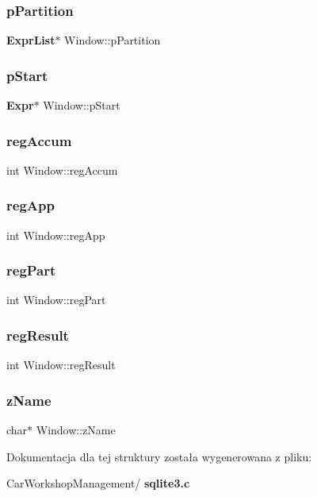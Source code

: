 \subsubsection{pPartition}
{\footnotesize\ttfamily \textbf{ Expr\+List}$\ast$ Window\+::p\+Partition}

\mbox{\label{struct_window_af181bb0792e99ca41c9c3e65b7dd5750}} 
\subsubsection{pStart}
{\footnotesize\ttfamily \textbf{ Expr}$\ast$ Window\+::p\+Start}

\mbox{\label{struct_window_a8b3fa6342025b8c9486cc88206591838}} 
\subsubsection{regAccum}
{\footnotesize\ttfamily int Window\+::reg\+Accum}

\mbox{\label{struct_window_ab7763e537efa72f78ba87c2afdcda241}} 
\subsubsection{regApp}
{\footnotesize\ttfamily int Window\+::reg\+App}

\mbox{\label{struct_window_acf3f9c3942e59131d7134c1a661e2d55}} 
\subsubsection{regPart}
{\footnotesize\ttfamily int Window\+::reg\+Part}

\mbox{\label{struct_window_ab97911409ee585c814a7f3fa68e17256}} 
\subsubsection{regResult}
{\footnotesize\ttfamily int Window\+::reg\+Result}

\mbox{\label{struct_window_a5be46f4aeeb33251474d18276d9a2eda}} 
\subsubsection{zName}
{\footnotesize\ttfamily char$\ast$ Window\+::z\+Name}



Dokumentacja dla tej struktury została wygenerowana z pliku\+:\begin{DoxyCompactItemize}
\item 
Car\+Workshop\+Management/\textbf{ sqlite3.\+c}\end{DoxyCompactItemize}
